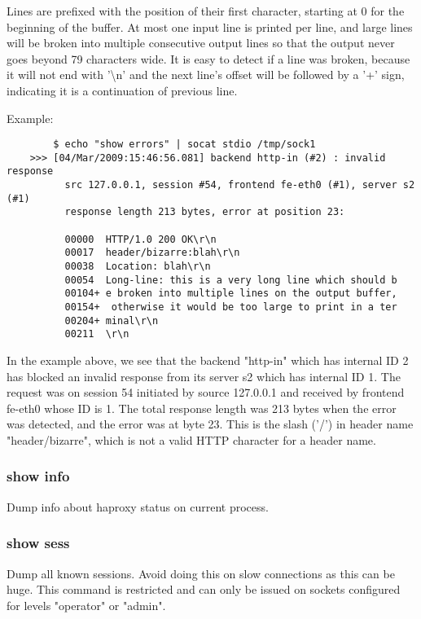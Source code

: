   Lines are prefixed with the position of their first character, starting at 0
  for the beginning of the buffer. At most one input line is printed per line,
  and large lines will be broken into multiple consecutive output lines so that
  the output never goes beyond 79 characters wide. It is easy to detect if a
  line was broken, because it will not end with '\textbackslash n' and the next line's offset
  will be followed by a '+' sign, indicating it is a continuation of previous
  line.

  Example:
  \begin{verbatim}
        $ echo "show errors" | socat stdio /tmp/sock1
    >>> [04/Mar/2009:15:46:56.081] backend http-in (#2) : invalid response
          src 127.0.0.1, session #54, frontend fe-eth0 (#1), server s2 (#1)
          response length 213 bytes, error at position 23:

          00000  HTTP/1.0 200 OK\r\n
          00017  header/bizarre:blah\r\n
          00038  Location: blah\r\n
          00054  Long-line: this is a very long line which should b
          00104+ e broken into multiple lines on the output buffer,
          00154+  otherwise it would be too large to print in a ter
          00204+ minal\r\n
          00211  \r\n
  \end{verbatim}

    In the example above, we see that the backend "http-in" which has internal
    ID 2 has blocked an invalid response from its server s2 which has internal
    ID 1. The request was on session 54 initiated by source 127.0.0.1 and
    received by frontend fe-eth0 whose ID is 1. The total response length was
    213 bytes when the error was detected, and the error was at byte 23. This
    is the slash ('/') in header name "header/bizarre", which is not a valid
    HTTP character for a header name.

\subsubsection[show info]{show info}
  Dump info about haproxy status on current process.

\subsubsection[show sess]{show sess}
  Dump all known sessions. Avoid doing this on slow connections as this can
  be huge. This command is restricted and can only be issued on sockets
  configured for levels "operator" or "admin".

